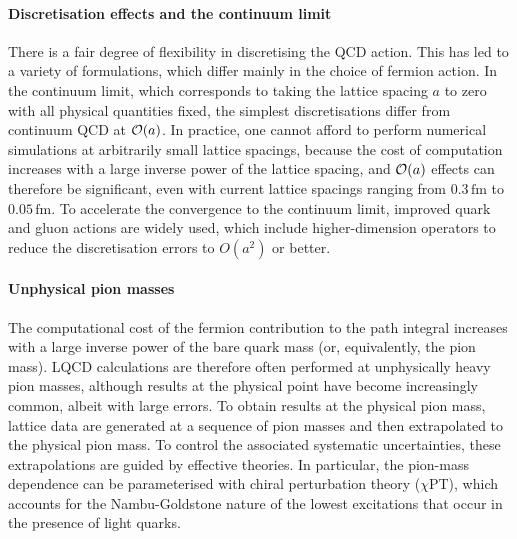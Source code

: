 \paragraph{Discretisation effects and the continuum limit} There is a fair degree of flexibility in discretising the QCD action. This has led to a variety of formulations, which differ mainly in the choice of fermion action. In the continuum limit, which corresponds to taking the lattice spacing $a$ to zero with all physical quantities fixed, the simplest discretisations differ from continuum QCD at ${\cal O}(a)$. In practice, one cannot afford to perform numerical simulations at arbitrarily small lattice spacings, because the cost of computation increases with a large inverse power of the lattice spacing, and ${\cal O}(a)$ effects can therefore be significant, even with current lattice spacings ranging from $0.3 \,\mbox{fm}$ to $0.05 \,\mbox{fm}$. To accelerate the convergence to the continuum limit, improved quark and gluon actions are widely used, which include higher-dimension operators to reduce the discretisation errors to $O(a^2)$ or better.

\paragraph{Unphysical pion masses} The computational cost of the fermion contribution to the path integral increases with a large inverse power of the bare quark mass (or, equivalently, the pion mass). LQCD calculations are therefore often performed at unphysically heavy pion masses, although results at the physical point have become increasingly common, albeit with large errors. To obtain results at the physical pion mass, lattice data are generated at a sequence of pion masses and then extrapolated to the physical pion mass. To control the associated systematic uncertainties, these extrapolations are guided by effective theories. In particular, the pion-mass dependence can be parameterised with chiral perturbation theory ($\chi$PT), which accounts for the Nambu-Goldstone nature of the lowest excitations that occur in the presence of light quarks.

